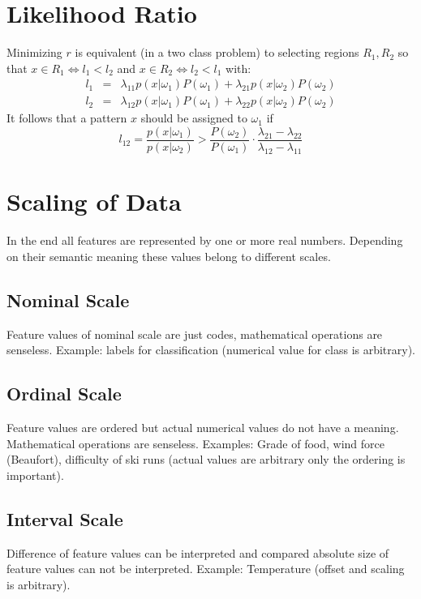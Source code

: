 \section{Likelihood Ratio}
Minimizing $r$ is equivalent (in a two class problem) to selecting regions $R_1, R_2$ so that $x \in R_1 \Leftrightarrow l_1 < l_2$ and $x \in R_2 \Leftrightarrow l_2 < l_1$ with:
\begin{eqnarray*}
    l_1 &=& \lambda_{11} p(x | \omega_1) P(\omega_1) + \lambda_{21} p(x | \omega_2) P(\omega_2) \\
    l_2 &=& \lambda_{12} p(x | \omega_1) P(\omega_1) + \lambda_{22} p(x | \omega_2) P(\omega_2)
\end{eqnarray*}
It follows that a pattern $x$ should be assigned to $\omega_1$ if
\begin{equation*}
    l_{12} = \frac{p(x | \omega_1)}{p(x | \omega_2)} > \frac{P(\omega_2)}{P(\omega_1)} \cdot \frac{\lambda_{21} - \lambda_{22}}{\lambda_{12} - \lambda_{11}}
\end{equation*}

\section{Scaling of Data}
In the end all features are represented by one or more real numbers.
Depending on their semantic meaning these values belong to different scales.

\subsection{Nominal Scale}
Feature values of nominal scale are just codes, mathematical operations are senseless. Example: labels for classification (numerical value for class is arbitrary).

\subsection{Ordinal Scale}
Feature values are ordered but actual numerical values do not have a meaning. Mathematical operations are senseless. Examples: Grade of food, wind force (Beaufort), difficulty of ski runs (actual values are arbitrary only the ordering is important). 

\subsection{Interval Scale}
Difference of feature values can be interpreted and compared absolute size of feature values can not be interpreted. Example: Temperature (offset and scaling is arbitrary).

